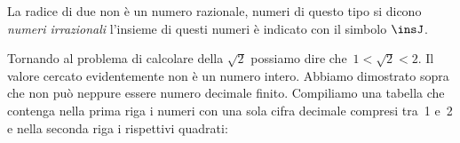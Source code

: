 
%
%

La radice di due non è un numero razionale, numeri di questo tipo si dicono
\emph{numeri irrazionali} l'insieme di questi numeri è indicato con il
simbolo \(\insJ\).

Tornando al problema di calcolare della \(\sqrt{2}\) possiamo dire
che~$1<\sqrt{2}<2$.
Il valore cercato evidentemente non è un numero intero.
Abbiamo dimostrato sopra che non può neppure essere
numero decimale finito.
Compiliamo una tabella che contenga nella prima
riga i numeri con una sola cifra decimale compresi tra~1 e~2 e nella
seconda riga i rispettivi quadrati:

